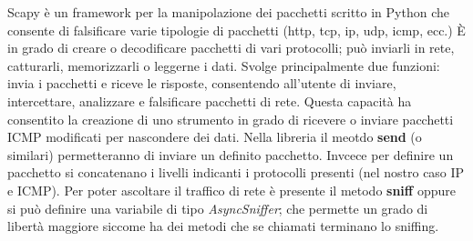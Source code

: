 %
Scapy \cite{scapy} è un framework per la manipolazione dei pacchetti scritto 
in Python che consente di falsificare varie tipologie di pacchetti (http, tcp, ip, udp, icmp, ecc.)
È in grado di creare o decodificare pacchetti di vari protocolli; 
può inviarli in rete, catturarli, memorizzarli o leggerne i dati. 
\vspace{2ex} \newline 
Svolge principalmente due funzioni: invia i pacchetti e riceve le risposte, consentendo all'utente di
inviare, intercettare, analizzare e falsificare pacchetti di rete.
Questa capacità ha consentito la creazione di uno strumento in grado di ricevere o 
inviare pacchetti ICMP modificati per nascondere dei dati. 
\vspace{1ex} \newline  
Nella libreria il meotdo \textbf{send} (o similari) permetteranno di inviare un definito pacchetto. 
Invcece per definire un pacchetto si concatenano i livelli \cite{scapy-inet} indicanti i 
protocolli presenti (nel nostro caso IP e ICMP). 
Per poter ascoltare il traffico di rete \cite{scapy-sniffing} è presente il metodo \textbf{sniff} oppure si può definire una variabile di tipo \textit{AsyncSniffer}; 
che permette un grado di libertà maggiore siccome ha dei metodi che se chiamati terminano lo sniffing. 

